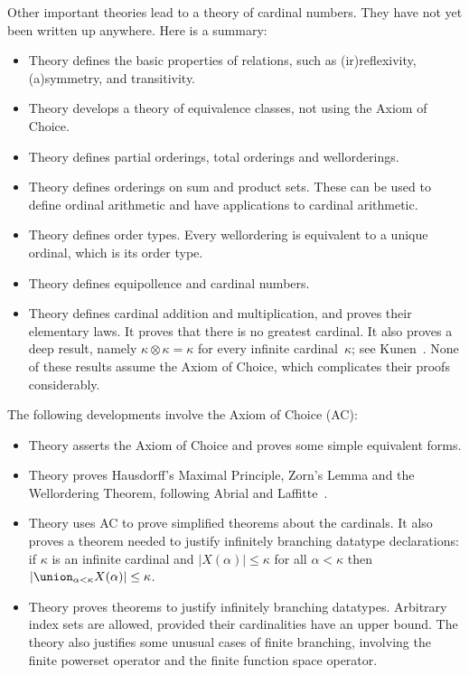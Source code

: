 Other important theories lead to a theory of cardinal numbers.  They have
not yet been written up anywhere.  Here is a summary:
\begin{itemize}
\item Theory  defines the basic properties of relations, such as
  (ir)reflexivity, (a)symmetry, and transitivity.

\item Theory  develops a theory of equivalence
  classes, not using the Axiom of Choice.

\item Theory  defines partial orderings, total orderings and
  wellorderings.

\item Theory  defines orderings on sum and product sets.
  These can be used to define ordinal arithmetic and have applications to
  cardinal arithmetic.

\item Theory  defines order types.  Every wellordering is
  equivalent to a unique ordinal, which is its order type.

\item Theory  defines equipollence and cardinal numbers.
 
\item Theory  defines cardinal addition and
  multiplication, and proves their elementary laws.  It proves that there
  is no greatest cardinal.  It also proves a deep result, namely
  $\kappa\otimes\kappa=\kappa$ for every infinite cardinal~$\kappa$; see
  Kunen~\cite[page 29]{kunen80}.  None of these results assume the Axiom of
  Choice, which complicates their proofs considerably.  
\end{itemize}

The following developments involve the Axiom of Choice (AC):
\begin{itemize}
\item Theory  asserts the Axiom of Choice and proves some simple
  equivalent forms.

\item Theory  proves Hausdorff's Maximal Principle, Zorn's Lemma
  and the Wellordering Theorem, following Abrial and
  Laffitte~\cite{abrial93}.

\item Theory  uses AC to prove simplified theorems about
  the cardinals.  It also proves a theorem needed to justify
  infinitely branching datatype declarations: if $\kappa$ is an infinite
  cardinal and $|X(\alpha)| \le \kappa$ for all $\alpha<\kappa$ then
  $|\union\sb{\alpha<\kappa} X(\alpha)| \le \kappa$.

\item Theory  proves theorems to justify infinitely
  branching datatypes.  Arbitrary index sets are allowed, provided their
  cardinalities have an upper bound.  The theory also justifies some
  unusual cases of finite branching, involving the finite powerset operator
  and the finite function space operator.
\end{itemize}



